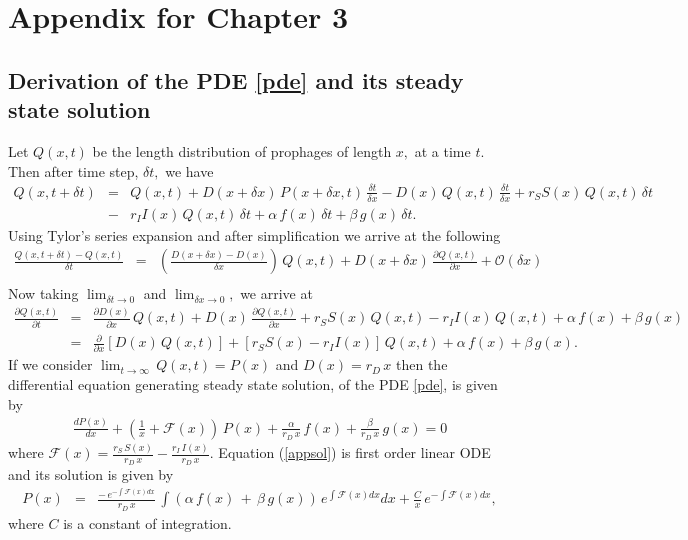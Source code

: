 \chapter{Appendix for Chapter 3}\label{AppA}
\section [Derivation of the PDE model and its steady state solution]{Derivation of the PDE \ref{pde} and its steady state solution }\label{a1}
Let $Q(x,t)$ be the length distribution of prophages of length $x,$ at a time $t.$ Then after time step, $\delta t,$ we have
\begin{eqnarray}\label{d1}
Q(x, t+\delta t) &=& Q(x,t)+ D(x+\delta x)\,P(x+\delta x, t)\, \frac{\delta t}{\delta x}-D(x)\,Q(x,t)\,\frac{\delta t}{\delta x}+ r_{S}S(x)\,Q(x,t)\,\delta t\nonumber\\
&-&r_{I}I(x)\,Q(x,t) \, \delta t+\alpha \, f(x)\, \delta t + \beta \, g(x)\, \delta t. \nonumber
\end{eqnarray}
Using Tylor's series expansion and after simplification we arrive at the following 
\begin{eqnarray}
\frac{Q(x,t+\delta t)- Q(x,t)}{\delta t}& = &   \left(\frac{D(x+\delta x)-D(x)}{\delta x}\right)\,Q(x,t)+D(x+\delta x)\,\frac{\partial Q(x,t)}{\partial x}+ \mathcal{O}(\delta x)\nonumber\\%
\end{eqnarray}
Now taking $\lim_{\delta t\to 0} $ and $\lim_{\delta x\to 0},$ we arrive at
\begin{eqnarray}\label{apppde}
\frac{\partial Q(x,t)}{\partial t} &=& \frac{\partial D(x)}{\partial x}\,Q(x,t)+D(x)\,\frac{\partial Q(x,t)}{\partial x}+r_{S}S(x)\,Q(x,t)-r_{I}I(x)\,Q(x,t)+\alpha \, f(x) + \beta \, g(x)\nonumber\\ 
&=& \frac{\partial }{\partial x}[D(x)\, Q(x,t)]+ [r_{S}S(x)-r_{I}I(x)]\,Q(x,t)+\alpha \, f(x)+ \beta \, g(x).
\end{eqnarray}
If we consider $\lim_{t \to \infty}\,Q(x, t)=P(x)$ and  $D(x) = r_{D}\,x$
then the differential equation generating steady state solution, of the PDE \ref{pde}, is given by \begin{eqnarray}\label{appsol1}
 \frac{d P(x) }{d x}+ \left(\frac{1}{x}+\mathcal{F}(x)\right)\,P(x)+\frac{\alpha}{r_{D}\, x} \, f(x)  + \frac{\beta}{r_{D}\,x} \, g(x) =0
\end{eqnarray}
where $\mathcal{F}(x) = \frac{r_S\, S(x)}{r_D\,x }- \frac{r_{I}\, I(x)}{r_D\, x}.$
Equation (\ref{appsol}) is first order linear ODE and its solution is given by 
\begin{eqnarray}\label{ssol1}
P(x) &=&\frac{-\,e^{-\int{\mathcal{F}}(x)dx} }{r_D\, x}\,\int{(\alpha \,f(x)\, + \, \beta\, g(x))\,e^{\int{\mathcal{F}}(x)dx}dx}+\frac{C}{x}\, e^{-\int{\mathcal{F}}(x)dx},
\end{eqnarray}
where $C$ is a constant of integration.
